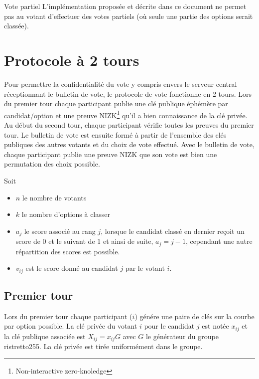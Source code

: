 \documentclass[../report]{subfiles}
\begin{document}
\begin{nota}{Vote partiel}
	L'implémentation proposée et décrite dans ce document ne permet pas au votant d'effectuer des votes 
	partiels (où seule une partie des options serait classée).
\end{nota}


\section{Protocole à 2 tours}

Pour permettre la confidentialité du vote y compris envers le serveur central réceptionnant
le bulletin de vote, le protocole de vote fonctionne en 2 tours.
Lors du premier tour chaque participant publie une clé publique éphémère par candidat/option et une 
preuve NIZK\footnote{Non-interactive zero-knoledge} qu'il a bien connaissance de la clé privée.
Au début du second tour, chaque participant vérifie toutes les preuves du premier tour.
Le bulletin de vote est ensuite formé à partir de l'ensemble des clés publiques des autres 
votants et du choix de vote effectué.
Avec le bulletin de vote, chaque participant publie une preuve NIZK que son vote est bien 
une permutation des choix possible.

Soit 

\begin{itemize}
	\item $n$ le nombre de votants
	\item $k$ le nombre d'options à classer
	\item $a_j$ le score associé au rang $j$, lorsque le candidat classé en dernier reçoit un score de 0 et le suivant de 1 et ainsi de suite, $a_j = j - 1$, cependant une autre répartition des scores est possible.
	\item $v_{ij}$ est le score donné au candidat $j$ par le votant $i$.
\end{itemize}

\subsection{Premier tour}

Lors du premier tour chaque participant ($i$) génére une paire de clés sur la courbe par option possible.
La clé privée du votant $i$ pour le candidat $j$ est notée $x_{ij}$ et la clé publique associée 
est $X_{ij} = x_{ij} G$ avec $G$ le générateur du groupe ristretto255.
La clé privée est tirée uniformément dans le groupe.
\end{document}

